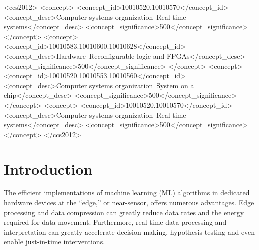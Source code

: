 \documentclass[tinyml]{acmart}
\newcommand{\hlsfml}{\texttt{hls4ml}\xspace}
\begin{document}
\begin{CCSXML}
<ccs2012>
<concept>
<concept_id>10010520.10010570</concept_id>
<concept_desc>Computer systems organization~Real-time systems</concept_desc>
<concept_significance>500</concept_significance>
</concept>
<concept>
<concept_id>10010583.10010600.10010628</concept_id>
<concept_desc>Hardware~Reconfigurable logic and FPGAs</concept_desc>
<concept_significance>500</concept_significance>
</concept>
<concept>
<concept_id>10010520.10010553.10010560</concept_id>
<concept_desc>Computer systems organization~System on a chip</concept_desc>
<concept_significance>500</concept_significance>
</concept>
<concept>
<concept_id>10010520.10010570</concept_id>
<concept_desc>Computer systems organization~Real-time systems</concept_desc>
<concept_significance>500</concept_significance>
</concept>
</ccs2012>
\end{CCSXML}




\maketitle


\section{Introduction}
The efficient implementations of machine learning (ML) algorithms in dedicated hardware devices at the ``edge,'' or near-sensor, offers numerous advantages.
Edge processing and data compression can greatly reduce data rates and the energy required for data movement.
Furthermore, real-time data processing and interpretation can greatly accelerate decision-making, hypothesis testing and even enable just-in-time interventions.
\end{document}
